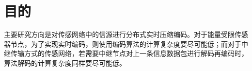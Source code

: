\section{目的}

主要研究方向是对传感网络中的信源进行分布式实时压缩编码。对于能量受限传感器节点，为了实现实时编码，则使用编码算法的计算复杂度要尽可能低；而对于中继传输方式的传感网络，若需要中继节点对上一条信息数据包进行解码再编码时，算法解码的计算复杂度同样要尽可能低。


